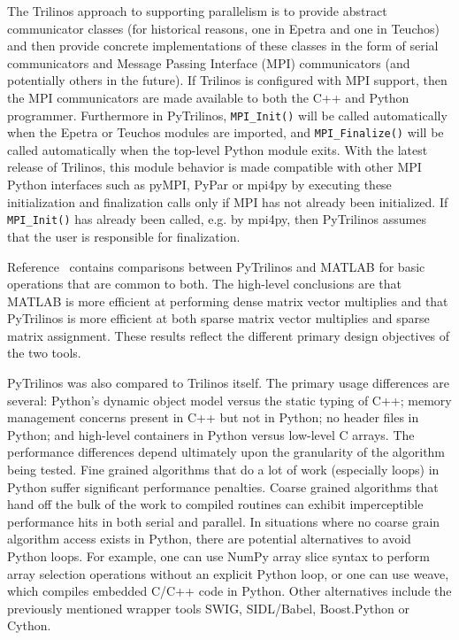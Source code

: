 \documentclass[11pt]{article}
\begin{document}
The Trilinos approach to supporting parallelism is to provide abstract communicator classes (for historical reasons, one in Epetra and one in Teuchos) and then provide concrete implementations of these classes in the form of serial communicators and Message Passing Interface (MPI) communicators (and potentially others in the future).  If Trilinos is configured with MPI support, then the MPI communicators are made available to both the C++ and Python programmer.  Furthermore in PyTrilinos, {\tt MPI\_Init()} will be called automatically when the Epetra or Teuchos modules are imported, and {\tt MPI\_Finalize()} will be called automatically when the top-level Python module exits.  With the latest release of Trilinos, this module behavior is made compatible with other MPI Python interfaces such as pyMPI, PyPar or mpi4py by executing these initialization and finalization calls only if MPI has not already been initialized.  If {\tt MPI\_Init()} has already been called, e.g. by mpi4py, then PyTrilinos assumes that the user is responsible for finalization.

Reference~\cite{PyTrilinos} contains comparisons between PyTrilinos and MATLAB for basic operations that are common to both.  The high-level conclusions are that MATLAB is more efficient at performing dense matrix vector multiplies and that PyTrilinos is more efficient at both sparse matrix vector multiplies and sparse matrix assignment.  These results reflect the different primary design objectives of the two tools.

PyTrilinos was also compared to Trilinos itself.  The primary usage differences are several: Python's dynamic object model versus the static typing of C++; memory management concerns present in C++ but not in Python; no header files in Python; and high-level containers in Python versus low-level C arrays.  The performance differences depend ultimately upon the granularity of the algorithm being tested.  Fine grained algorithms that do a lot of work (especially loops) in Python suffer significant performance penalties.  Coarse grained algorithms that hand off the bulk of the work to compiled routines can exhibit imperceptible performance hits in both serial and parallel.  In situations where no coarse grain algorithm access exists in Python, there are potential alternatives to avoid Python loops.  For example, one can use NumPy array slice syntax to perform array selection operations without an explicit Python loop, or one can use weave, which compiles embedded C/C++ code in Python.  Other alternatives include the previously mentioned wrapper tools SWIG, SIDL/Babel, Boost.Python or Cython.
\end{document}
